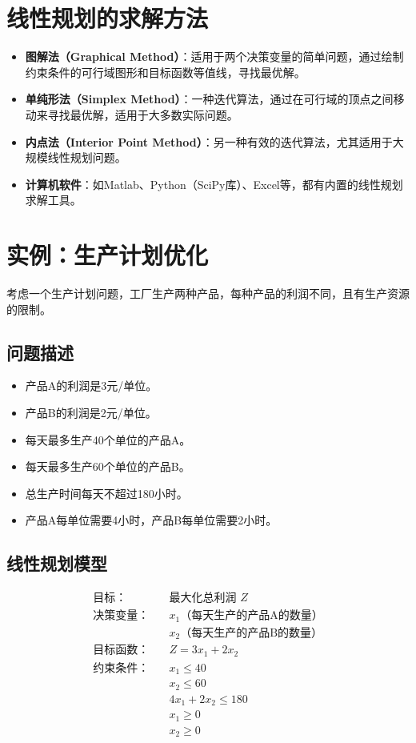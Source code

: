 \documentclass{article}
\begin{document}
\section{线性规划的求解方法}
\begin{itemize}
    \item \textbf{图解法（Graphical Method）}：适用于两个决策变量的简单问题，通过绘制约束条件的可行域图形和目标函数等值线，寻找最优解。
    \item \textbf{单纯形法（Simplex Method）}：一种迭代算法，通过在可行域的顶点之间移动来寻找最优解，适用于大多数实际问题。
    \item \textbf{内点法（Interior Point Method）}：另一种有效的迭代算法，尤其适用于大规模线性规划问题。
    \item \textbf{计算机软件}：如Matlab、Python（SciPy库）、Excel等，都有内置的线性规划求解工具。
\end{itemize}

\section{实例：生产计划优化}
考虑一个生产计划问题，工厂生产两种产品，每种产品的利润不同，且有生产资源的限制。

\subsection{问题描述}
\begin{itemize}
    \item 产品A的利润是3元/单位。
    \item 产品B的利润是2元/单位。
    \item 每天最多生产40个单位的产品A。
    \item 每天最多生产60个单位的产品B。
    \item 总生产时间每天不超过180小时。
    \item 产品A每单位需要4小时，产品B每单位需要2小时。
\end{itemize}

\subsection{线性规划模型}
\begin{align*}
\text{目标}： & \quad \text{最大化总利润 } Z \\
\text{决策变量}： & \quad x_1 \text{（每天生产的产品A的数量）} \\
& \quad x_2 \text{（每天生产的产品B的数量）} \\
\text{目标函数}： & \quad Z = 3x_1 + 2x_2 \\
\text{约束条件}： & \quad x_1 \leq 40 \\
& \quad x_2 \leq 60 \\
& \quad 4x_1 + 2x_2 \leq 180 \\
& \quad x_1 \geq 0 \\
& \quad x_2 \geq 0
\end{align*}
\end{document}

